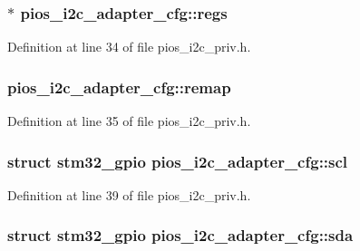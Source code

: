 \hypertarget{structpios__i2c__adapter__cfg_af657d3f333ba35a0c78315381851f748}{
\subsubsection[{regs}]{$\ast$ pios\-\_\-i2c\-\_\-adapter\-\_\-cfg\-::regs}}\label{structpios__i2c__adapter__cfg_af657d3f333ba35a0c78315381851f748}


Definition at line 34 of file pios\-\_\-i2c\-\_\-priv.\-h.

\hypertarget{structpios__i2c__adapter__cfg_a64d54eb4eb6d9aa0111e3f677afc37ba}{
\subsubsection[{remap}]{ pios\-\_\-i2c\-\_\-adapter\-\_\-cfg\-::remap}}\label{structpios__i2c__adapter__cfg_a64d54eb4eb6d9aa0111e3f677afc37ba}


Definition at line 35 of file pios\-\_\-i2c\-\_\-priv.\-h.

\hypertarget{structpios__i2c__adapter__cfg_a900bd610a99f0518997e6e2564ef15c7}{
\subsubsection[{scl}]{\setlength{\rightskip}{0pt plus 5cm}struct {\bf stm32\-\_\-gpio} pios\-\_\-i2c\-\_\-adapter\-\_\-cfg\-::scl}}\label{structpios__i2c__adapter__cfg_a900bd610a99f0518997e6e2564ef15c7}


Definition at line 39 of file pios\-\_\-i2c\-\_\-priv.\-h.

\hypertarget{structpios__i2c__adapter__cfg_a429bb7d5f0918ade96becff15a633875}{
\subsubsection[{sda}]{\setlength{\rightskip}{0pt plus 5cm}struct {\bf stm32\-\_\-gpio} pios\-\_\-i2c\-\_\-adapter\-\_\-cfg\-::sda}}\label{structpios__i2c__adapter__cfg_a429bb7d5f0918ade96becff15a633875}


